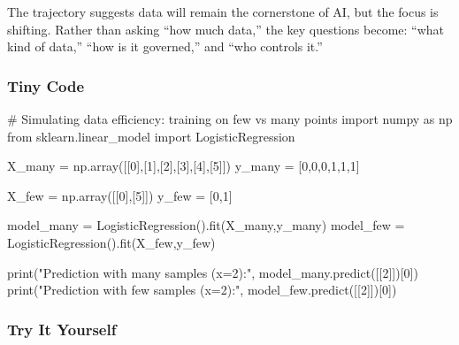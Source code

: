 \documentclass[
  letterpaper,
  DIV=11,
  numbers=noendperiod]{scrreprt}
\newenvironment{Shaded}{\begin{snugshade}}{\end{snugshade}}
\newcommand{\BuiltInTok}[1]{\textcolor[rgb]{0.00,0.23,0.31}{#1}}
\newcommand{\CommentTok}[1]{\textcolor[rgb]{0.37,0.37,0.37}{#1}}
\newcommand{\DecValTok}[1]{\textcolor[rgb]{0.68,0.00,0.00}{#1}}
\newcommand{\ImportTok}[1]{\textcolor[rgb]{0.00,0.46,0.62}{#1}}
\newcommand{\NormalTok}[1]{\textcolor[rgb]{0.00,0.23,0.31}{#1}}
\newcommand{\OperatorTok}[1]{\textcolor[rgb]{0.37,0.37,0.37}{#1}}
\newcommand{\StringTok}[1]{\textcolor[rgb]{0.13,0.47,0.30}{#1}}
\begin{document}
The trajectory suggests data will remain the cornerstone of AI, but the
focus is shifting. Rather than asking ``how much data,'' the key
questions become: ``what kind of data,'' ``how is it governed,'' and
``who controls it.''

\subsubsection{Tiny Code}\label{tiny-code-79}

\begin{Shaded}
\begin{Highlighting}[]
\CommentTok{\# Simulating data efficiency: training on few vs many points}
\ImportTok{import}\NormalTok{ numpy }\ImportTok{as}\NormalTok{ np}
\ImportTok{from}\NormalTok{ sklearn.linear\_model }\ImportTok{import}\NormalTok{ LogisticRegression}

\NormalTok{X\_many }\OperatorTok{=}\NormalTok{ np.array([[}\DecValTok{0}\NormalTok{],[}\DecValTok{1}\NormalTok{],[}\DecValTok{2}\NormalTok{],[}\DecValTok{3}\NormalTok{],[}\DecValTok{4}\NormalTok{],[}\DecValTok{5}\NormalTok{]])}
\NormalTok{y\_many }\OperatorTok{=}\NormalTok{ [}\DecValTok{0}\NormalTok{,}\DecValTok{0}\NormalTok{,}\DecValTok{0}\NormalTok{,}\DecValTok{1}\NormalTok{,}\DecValTok{1}\NormalTok{,}\DecValTok{1}\NormalTok{]}

\NormalTok{X\_few }\OperatorTok{=}\NormalTok{ np.array([[}\DecValTok{0}\NormalTok{],[}\DecValTok{5}\NormalTok{]])}
\NormalTok{y\_few }\OperatorTok{=}\NormalTok{ [}\DecValTok{0}\NormalTok{,}\DecValTok{1}\NormalTok{]}

\NormalTok{model\_many }\OperatorTok{=}\NormalTok{ LogisticRegression().fit(X\_many,y\_many)}
\NormalTok{model\_few }\OperatorTok{=}\NormalTok{ LogisticRegression().fit(X\_few,y\_few)}

\BuiltInTok{print}\NormalTok{(}\StringTok{"Prediction with many samples (x=2):"}\NormalTok{, model\_many.predict([[}\DecValTok{2}\NormalTok{]])[}\DecValTok{0}\NormalTok{])}
\BuiltInTok{print}\NormalTok{(}\StringTok{"Prediction with few samples (x=2):"}\NormalTok{, model\_few.predict([[}\DecValTok{2}\NormalTok{]])[}\DecValTok{0}\NormalTok{])}
\end{Highlighting}
\end{Shaded}

\subsubsection{Try It Yourself}\label{try-it-yourself-79}
\end{document}
